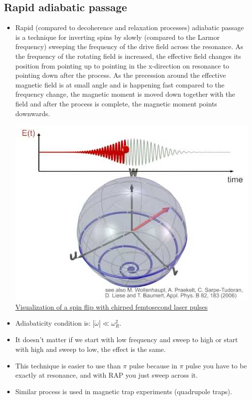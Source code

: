 \documentclass[AtomicOptical1Notes.tex]{subfiles}
\begin{document}
	\subsection{Rapid adiabatic passage}
		\begin{itemize}
			\item Rapid (compared to decoherence and relaxation processes) adiabatic passage is a technique for inverting spins by slowly (compared to the Larmor frequency) sweeping the frequency of the drive field across the resonance. As the frequency of the rotating field is increased, the effective field changes its position from pointing up to pointing in the x-direction on resonance to pointing down after the process. As the precession around the effective magnetic field is at small angle and is happening fast compared to the frequency change, the magnetic moment is moved down together with the field and after the process is complete, the magnetic moment points downwards.
			
			\includegraphics{spinflip}
			\href{https://www.youtube.com/watch?v=n4iIx8XuJlU}{\color{blue} \underline{Visualization of a spin flip with chirped femtosecond laser pulses}}
			
			\item Adiabaticity condition is: $ |\dot{\omega}| \ll \omega_R^2$.
			\item It doesn't matter if we start with low frequency and sweep to high or start with high and sweep to low, the effect is the same.
			\item This technique is easier to use than $\pi$ pulse because in $\pi$ pulse you have to be exactly at resonance, and with RAP you just sweep across it.
			\item Similar process is used in magnetic trap experiments (quadrupole traps).
		\end{itemize}
\end{document}
